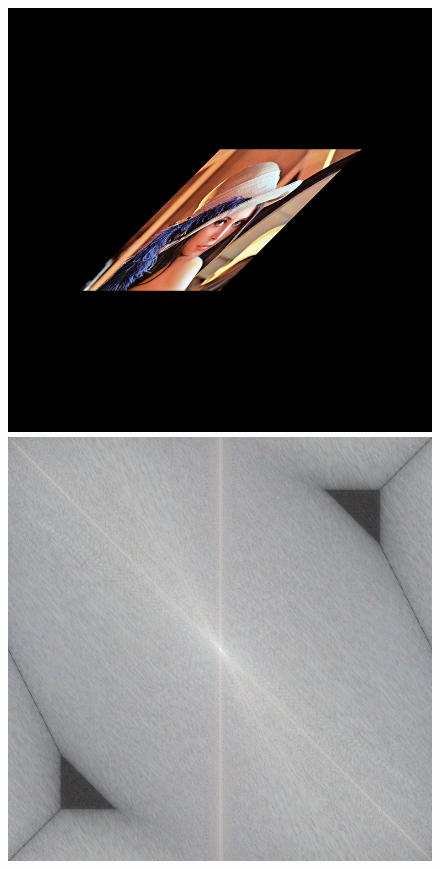 \begin{figure}
{			{\includegraphics[scale=0.125]{decompoSzeliski_image4.png}}
			{\includegraphics[scale=0.125]{decompoSzeliski_fourier4.png}}
		}
\end{figure}
